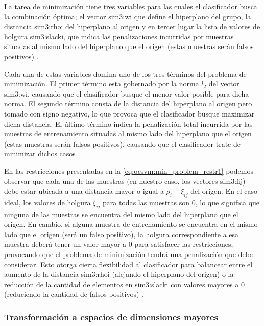 La tarea de minimización tiene tres variables para las cuales el clasificador
busca la combinación óptima; el vector \gls{sim3:wi} que define el hiperplano
del grupo, la distancia \gls{sim3:rhoi} del hiperplano al origen y en tercer
lugar la lista de valores de holgura \gls{sim3:slacki}, que indica las
penalizaciones incurridas por muestras situadas al mismo lado del hiperplano
que el origen (estas muestras serán falsos positivos)
\citep{parhizkar2015oc}. %

Cada una de estas variables domina uno de los tres términos del problema
de minimización. El primer término esta gobernado por la norma $l_{2}$
del vector \gls{sim3:wi}, causando que el clasificador busque el menor
valor posible para dicha norma.
El segundo término consta de la distancia del hiperplano al origen pero
tomado con signo negativo, lo que provoca que el clasificador busque
maximizar dicha distancia. El último término indica la penalización total
incurrida por las muestras de entrenamiento situadas al mismo lado del
hiperplano que el origen (estas muestras serán falsos positivos), causando
que el clasificador trate de minimizar dichos casos
\citep{parhizkar2015oc}. %

En las restricciones presentadas en la \autoref{eq:ocsvm:min_problem_restr1}
podemos observar que cada una de las muestras (en nuestro caso, los
vectores \gls{sim3:fij}) debe estar ubicada a una distancia mayor o igual
a $\rho_{i} - \xi_{ij}$ del origen. En el caso ideal, los valores de
holgura $\xi_{ij}$ para todas las muestras son 0, lo que significa que
ninguna de las muestras se encuentra del mismo lado del hiperplano que el
origen. En cambio, si alguna muestra de entrenamiento se encuentra en el
mismo lado que el origen (será un falso positivo), la holgura correspondiente
a esa muestra deberá tener un valor mayor a 0 para satisfacer las
restricciones, provocando que el problema de minimización tendrá una
penalización que debe considerar.
Esto otorga cierta flexibilidad al clasificador para balancear entre el
aumento de la distancia \gls{sim3:rhoi} (alejando el hiperplano del
origen) o la reducción de la cantidad de elementos en \gls{sim3:slacki}
con valores mayores a 0 (reduciendo la cantidad de falsos positivos)
\citep{parhizkar2015oc}. %


\subsubsection{Transformación a espacios de dimensiones mayores}

